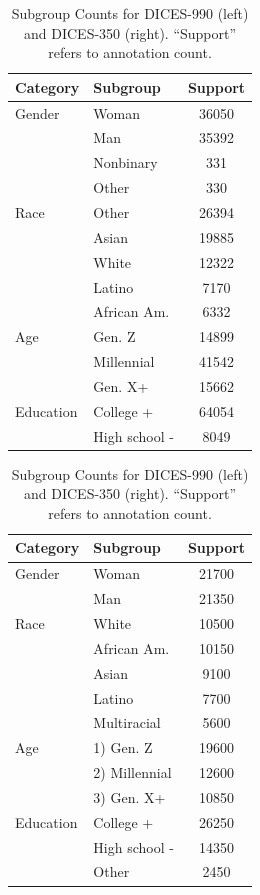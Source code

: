 \documentclass[manuscript,screen,review,anonymous]{acmart}
\theoremstyle{acmplain}
\theoremstyle{researchquestionstyle}
\begin{document}
\begin{table}[t]
	\caption{Subgroup Counts for DICES-990 (left) and DICES-350 (right). ``Support'' refers to annotation count.}
	\label{tab:dices-stats}
	\small
	\centering
	\begin{minipage}[t]{0.485\linewidth}
			\begin{tabular}{llc}
				\toprule
				\textbf{Category} & \textbf{Subgroup} & \textbf{Support} \\
				\midrule
				Gender & Woman & 36050 \\
				& Man & 35392 \\
				& Nonbinary & 331 \\
				& Other & 330 \\
				\midrule
				Race & Other & 26394 \\
				& Asian & 19885 \\
				& White & 12322 \\
				& Latino & 7170 \\
				& African Am. & 6332 \\
				\midrule
				Age & Gen. Z & 14899 \\
				& Millennial & 41542 \\
				& Gen. X+ & 15662 \\
				\midrule
				Education & College + & 64054 \\
				& High school - & 8049 \\
				\bottomrule
			\end{tabular}
	\end{minipage}
	\begin{minipage}[t]{0.45\linewidth}
			\begin{tabular}{llc}
				\toprule
				\textbf{Category} & \textbf{Subgroup}  & \textbf{Support}\\
				\midrule
				Gender & Woman & 21700 \\
				& Man & 21350 \\
				\midrule
				Race & White & 10500 \\
				& African Am. & 10150 \\
				& Asian & 9100 \\
				& Latino & 7700 \\
				& Multiracial & 5600 \\
				\midrule
				Age & 1) Gen. Z & 19600 \\
				& 2) Millennial & 12600 \\
				& 3) Gen. X+ & 10850 \\
				\midrule
				Education & College + & 26250 \\
				& High school - & 14350 \\
				& Other & 2450 \\
				\bottomrule
			\end{tabular}
	\end{minipage}
\end{table}
\end{document}
